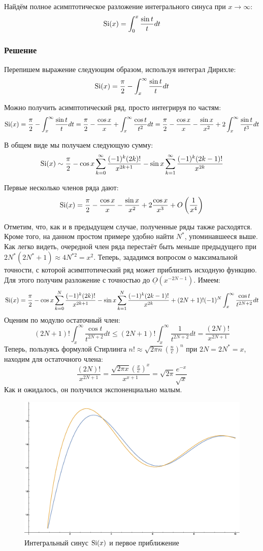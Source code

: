 \documentclass[a4paper,12pt]{article}
\begin{document}
Найдём полное асимптотическое разложение интегрального синуса при
$x\to\infty$:
\[
{\rm Si}(x)=\int_{0}^{x}\frac{\sin t}{t}dt
\]



\subsubsection*{Решение}

Перепишем выражение следующим образом, используя интеграл Дирихле:
\[
{\rm Si}(x)=\frac{\pi}{2}-\int_{x}^{\infty}\frac{\sin t}{t}dt
\]

\noindent
Можно получить асимптотический ряд, просто интегрируя по частям:
\[
{\rm Si}(x)=\frac{\pi}{2}-\int_{x}^{\infty}\frac{\sin t}{t}dt=\frac{\pi}{2}-\frac{\cos x}{x}+\int_{x}^{\infty}\frac{\cos t}{t^{2}}dt=\frac{\pi}{2}-\frac{\cos x}{x}-\frac{\sin x}{x^{2}}+2\int_{x}^{\infty}\frac{\sin t}{t^{3}}dt
\]

\noindent
В общем виде мы получаем следующую сумму:
\[
{\rm Si}(x)\sim\frac{\pi}{2}-\cos x\sum_{k=0}^{\infty}\frac{(-1)^{k}(2k)!}{x^{2k+1}}-\sin x\sum_{k=1}^{\infty}\frac{(-1)^{k}(2k-1)!}{x^{2k}}
\]

\noindent
Первые несколько членов ряда дают:
\[
{\rm Si}(x)=\frac{\pi}{2}-\frac{\cos x}{x}-\frac{\sin x}{x^{2}}+2\frac{\cos x}{x^{3}}+O\left(\frac{1}{x^{4}}\right)
\]

\noindent
Отметим, что, как и в предыдущем случае, полученные ряды также расходятся. Кроме того, на данном простом примере удобно найти $N^{*}$, упоминавшееся выше. Как легко видеть, очередной член ряда перестаёт быть меньше предыдущего при $2N^{*}(2N^{*}+1)\approx4N^{*2}=x^2$. Теперь, зададимся вопросом о максимальной точности, с которой асимптотический ряд может приблизить исходную функцию. Для этого получим разложение с точностью до $\underline{O}\left(x^{-2N-1}\right)$. Имеем:
\[
{\rm Si}(x)=\frac{\pi}{2}-\cos x\sum_{k=0}^{N}\frac{(-1)^{k}(2k)!}{x^{2k+1}}-\sin x\sum_{k=1}^{N}\frac{(-1)^{k}(2k-1)!}{x^{2k}}+(2N+1)!(-1)^N\int_x^{\infty}\frac{\cos t}{t^{2N+2}}dt
\]
Оценим по модулю остаточный член:
\[
(2N+1)!\int_x^{\infty}\frac{\cos t}{t^{2N+2}}dt\le(2N+1)!\int_x^{\infty}\frac{1}{t^{2N+2}}dt=\frac{(2N)!}{x^{2N+1}}
\]
Теперь, пользуясь формулой Стирлинга $n!\approx\sqrt{2\pi n}\left(\frac{n}{e}\right)^n$ при $2N=2N^{*}=x$, находим для остаточного члена:
\[
\frac{(2N)!}{x^{2N+1}}=\frac{\sqrt{2\pi x}\left(\frac{x}{e}\right)^{x}}{x^{x+1}}=\sqrt{2\pi} \frac{e^{-x}}{\sqrt{x}}
\]
Как и ожидалось, он получился экспоненциально малым.
\begin{figure}[h]
\caption{Интегральный синус ${\rm Si}(x)$ и первое приближение}
\centering
\includegraphics[width=0.65\columnwidth]{sinintegral.eps}
\end{figure}
\end{document}
